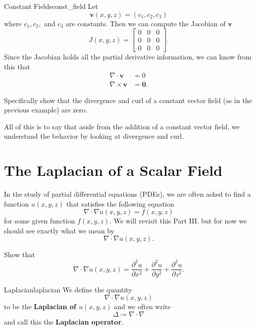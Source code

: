         \begin{ex}{Constant Fields}{const_field}
        Let 
        \[
        \mathbf{v}(x,y,z) = (c_1,c_2,c_3)
        \]
        where $c_1,c_2,$ and $c_3$ are constants.  Then we can compute the Jacobian of $\mathbf{v}$
        \[
        J(x,y,z) = \begin{bmatrix} 0 & 0 & 0 \\ 0 & 0 & 0\\ 0 & 0 &0 \end{bmatrix}.
        \]
        Since the Jacobian holds all the partial derivative information, we can know from this that 
        \begin{align*}
            \nabla \cdot \mathbf{v} &= 0\\
            \nabla \times \mathbf{v} &= \mathbf{0}.
        \end{align*}
        \end{ex}
        
        \begin{exercise}
        Specifically show that the divergence and curl of a constant vector field (as in the previous example) are zero.  
        \end{exercise}
        
        All of this is to say that aside from the addition of a constant vector field, we understand the behavior by looking at divergence and curl.
        
        \section{The Laplacian of a Scalar Field}
        In the study of partial differential equations (PDEs), we are often asked to find a function $u(x,y,z)$ that satisfies the following equation
        \[
        \nabla \cdot \nabla u(x,y,z) = f(x,y,z)
        \]
        for some given function $f(x,y,z)$.  We will revisit this Part III, but for now we should see exactly what we mean by
        \[
        \nabla \cdot \nabla u(x,y,z).
        \]
        
        \begin{exercise}
        Show that
        \[
        \nabla \cdot \nabla u(x,y,z) = \frac{\partial^2 u}{\partial x^2} + \frac{\partial^2 u}{\partial y^2} + \frac{\partial^2 u}{\partial z^2}.
        \]
        \end{exercise}
        
        \begin{df}{Laplacian}{laplacian}
        We define the quantity
        \[
        \nabla \cdot \nabla u(x,y,z)
        \]
        to be the \textbf{Laplacian of $u(x,y,z)$} and we often write
        \[
        \Delta \coloneqq \nabla \cdot \nabla
        \]
        and call this the \textbf{Laplacian operator}.
        \end{df}
        
